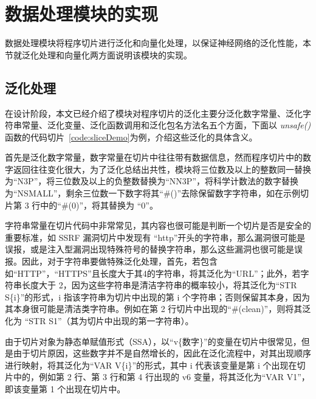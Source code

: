 \begin{minipage}[!htbp]{0.9\textwidth}
    
\end{minipage}

\section{数据处理模块的实现}

数据处理模块将程序切片进行泛化和向量化处理，以保证神经网络的泛化性能，本节就泛化处理和向量化两方面说明该模块的实现。\\

\subsection{泛化处理}

在设计阶段，本文已经介绍了模块对程序切片的泛化主要分泛化数字常量、泛化字符串常量、泛化变量、泛化函数调用和泛化包名方法名五个方面，下面以 \textit{unsafe()} 函数的代码切片~\ref{code:sliceDemo}为例，介绍这些泛化的具体含义。

\begin{minipage}[!htbp]{0.9\textwidth}
    
\end{minipage}

首先是泛化数字常量，数字常量在切片中往往带有数据信息，然而程序切片中的数字返回往往变化很大，为了泛化总结出共性，模块将三位数及以上的整数同一替换为“N3P”，将三位数及以上的负整数替换为“NN3P”，将科学计数法的数字替换为“NSMALL”，剩余三位数一下数字将其“\#()”去除保留数字字符串，如在示例切片第 3 行中的“\#(0)”，将其替换为 “0”。

字符串常量在切片代码中非常常见，其内容也很可能是判断一个切片是否是安全的重要标准，如 SSRF 漏洞切片中发现有 “http”开头的字符串，那么漏洞很可能是误报，或是注入型漏洞出现特殊符号的替换字符串，那么这些漏洞也很可能是误报。因此，对于字符串要做特殊泛化处理，首先，若包含如“HTTP”，“HTTPS”且长度大于其4的字符串，将其泛化为“URL”；此外，若字符串长度大于 2，因为这些字符串是清洁字符串的概率较小，将其泛化为“STR S\{i\}”的形式，i 指该字符串为切片中出现的第 i 个字符串；否则保留其本身，因为其本身很可能是清洁类字符串。例如在第 2 行切片中出现的“\#(clean)”，则将其泛化为 “STR S1”（其为切片中出现的第一字符串）。

由于切片对象为静态单赋值形式（SSA），以“v\{数字\}”的变量在切片中很常见，但是由于切片原因，这些数字并不是自然增长的，因此在泛化流程中，对其出现顺序进行映射，将其泛化为“VAR V\{i\}”的形式，其中 i 代表该变量是第 i 个出现在切片中的，例如第 2 行、第 3 行和第 4 行出现的 v6 变量，将其泛化为“VAR V1”，即该变量第 1 个出现在切片中。

